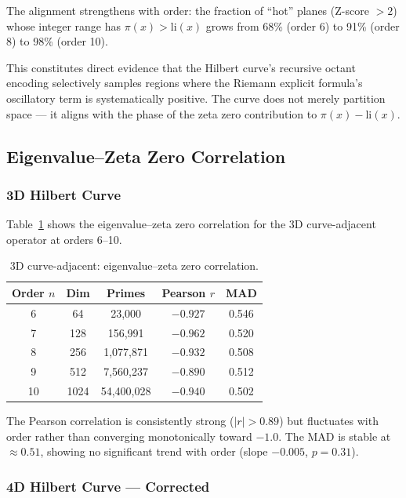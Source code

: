 \documentclass[11pt,a4paper]{article}
\begin{document}
The alignment strengthens with order: the fraction of ``hot'' planes
(Z-score $> 2$) whose integer range has $\pi(x) > \text{li}(x)$ grows from
68\% (order 6) to 91\% (order 8) to 98\% (order 10).

This constitutes direct evidence that the Hilbert curve's recursive octant
encoding selectively samples regions where the Riemann explicit formula's
oscillatory term is systematically positive. The curve does not merely
partition space --- it aligns with the phase of the zeta zero contribution
to $\pi(x) - \text{li}(x)$.

\subsection{Eigenvalue--Zeta Zero Correlation}
\label{sec:eigenvalue-correlation}

\subsubsection{3D Hilbert Curve}

Table~\ref{tab:3d-eigenvalue} shows the eigenvalue--zeta zero correlation
for the 3D curve-adjacent operator at orders 6--10.

\begin{table}[h]
\centering
\begin{tabular}{ccccc}
\toprule
Order $n$ & Dim & Primes & Pearson $r$ & MAD \\
\midrule
6  & 64   & 23,000      & $-0.927$ & 0.546 \\
7  & 128  & 156,991     & $-0.962$ & 0.520 \\
8  & 256  & 1,077,871   & $-0.932$ & 0.508 \\
9  & 512  & 7,560,237   & $-0.890$ & 0.512 \\
10 & 1024 & 54,400,028  & $-0.940$ & 0.502 \\
\bottomrule
\end{tabular}
\caption{3D curve-adjacent: eigenvalue--zeta zero correlation.}
\label{tab:3d-eigenvalue}
\end{table}

The Pearson correlation is consistently strong ($|r| > 0.89$) but
fluctuates with order rather than converging monotonically toward $-1.0$.
The MAD is stable at $\approx 0.51$, showing no significant trend with
order (slope $-0.005$, $p = 0.31$).

\subsubsection{4D Hilbert Curve --- Corrected}
\end{document}
